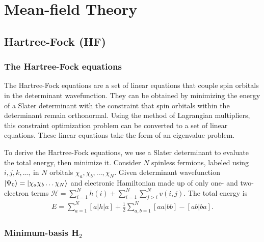 \section{Mean-field Theory}
\subsection{Hartree-Fock (HF)}

\newcommand{\hcore}{H^{\text{core}}_{\mu\nu}}

\subsubsection{The Hartree-Fock equations}
The Hartree-Fock equations are a set of linear equations that couple spin orbitals in the determinant wavefunction. They can be obtained by minimizing the energy of a Slater determinant with the constraint that spin orbitals within the determinant remain orthonormal. Using the method of Lagrangian multipliers, this constraint optimization problem can be converted to a set of linear equations. These linear equations take the form of an eigenvalue problem.

To derive the Hartree-Fock equations, we use a Slater determinant to evaluate the total energy, then minimize it. Consider $N$ spinless fermions, labeled using $i,j,k,\dots$, in $N$ orbitals $\chi_a,\chi_b,\dots,\chi_N$. Given determinant wavefunction $\ket{\Psi_0}=\ket{\chi_a\chi_b\dots\chi_N}$ and electronic Hamiltonian made up of only one- and two-electron terms $\mathcal{H}=\sum\limits_{i=1}^N h(i) + \sum\limits_{i=1}^N\sum\limits_{j>i}^N v(i,j)$. The total energy is
\begin{align}
E= \sum\limits_{a=1}^N [a|h|a] + \frac{1}{2}\sum\limits_{a,b=1}^N [aa|bb] - [ab|ba].
\end{align}

\subsubsection{Minimum-basis H$_2$}

